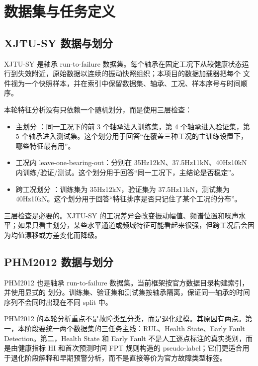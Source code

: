 \section{数据集与任务定义}

\subsection{XJTU-SY 数据与划分}

XJTU-SY 是轴承 run-to-failure 数据集。每个轴承在固定工况下从较健康状态运行到失效附近，原始数据以连续的振动快照组织；本项目的数据加载器把每个  文件视为一个快照样本，并在索引中保留数据集、轴承、工况、样本序号与时间顺序。

本轮特征分析没有只依赖一个随机划分，而是使用三层检查：

\begin{itemize}[leftmargin=2em]
  \item 主划分 ：同一工况下的前 3 个轴承进入训练集，第 4 个轴承进入验证集，第 5 个轴承进入测试集。这个划分用于回答“在覆盖三种工况的主训练设置下，哪些特征最有用”。
  \item 工况内 leave-one-bearing-out：分别在 35Hz12kN、37.5Hz11kN、40Hz10kN 内训练/验证/测试。这个划分用于回答“同一工况下，主结论是否稳定”。
  \item 跨工况划分 ：训练集为 35Hz12kN，验证集为 37.5Hz11kN，测试集为 40Hz10kN。这个划分用于回答“特征排序是否只记住了某个工况的分布”。
\end{itemize}

三层检查是必要的。XJTU-SY 的工况差异会改变振动幅值、频谱位置和噪声水平；如果只看主划分，某些水平通道或频域特征可能看起来很强，但跨工况后会因为均值漂移或方差变化而降级。



\subsection{PHM2012 数据与划分}

PHM2012 也是轴承 run-to-failure 数据集。当前框架按官方数据目录构建索引，并使用显式的  划分。训练集、验证集和测试集按轴承隔离，保证同一轴承的时间序列不会同时出现在不同 split 中。

PHM2012 的本轮分析重点不是故障类型分类，而是退化建模。其原因有两点。第一，本阶段要统一两个数据集的三任务主线：RUL、Health State、Early Fault Detection。第二，Health State 和 Early Fault 不是人工逐点标注的真实类别，而是由健康指标 HI 和首次预测时间 FPT 规则构造的 pseudo-label；它们更适合用于退化阶段解释和早期预警分析，而不是直接等价为官方故障类型标签。

